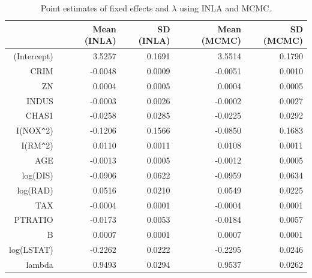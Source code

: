 \documentclass[article]{jss}
\begin{document}
\begin{table}[ht]
\centering
\begin{tabular}{rrrrr}
  \hline
 & Mean (INLA) & SD (INLA) & Mean (MCMC) & SD (MCMC) \\ 
  \hline
(Intercept) & 3.5257 & 0.1691 & 3.5514 & 0.1790 \\ 
  CRIM & -0.0048 & 0.0009 & -0.0051 & 0.0010 \\ 
  ZN & 0.0004 & 0.0005 & 0.0004 & 0.0005 \\ 
  INDUS & -0.0003 & 0.0026 & -0.0002 & 0.0027 \\ 
  CHAS1 & -0.0258 & 0.0285 & -0.0225 & 0.0292 \\ 
  I(NOX\verb|^|2) & -0.1206 & 0.1566 & -0.0850 & 0.1683 \\ 
  I(RM\verb|^|2) & 0.0110 & 0.0011 & 0.0108 & 0.0011 \\ 
  AGE & -0.0013 & 0.0005 & -0.0012 & 0.0005 \\ 
  log(DIS) & -0.0906 & 0.0622 & -0.0959 & 0.0634 \\ 
  log(RAD) & 0.0516 & 0.0210 & 0.0549 & 0.0225 \\ 
  TAX & -0.0004 & 0.0001 & -0.0004 & 0.0001 \\ 
  PTRATIO & -0.0173 & 0.0053 & -0.0184 & 0.0057 \\ 
  B & 0.0007 & 0.0001 & 0.0007 & 0.0001 \\ 
  log(LSTAT) & -0.2262 & 0.0222 & -0.2295 & 0.0246 \\ 
  lambda & 0.9493 & 0.0294 & 0.9537 & 0.0262 \\ 
   \hline
\end{tabular}
\caption{Point estimates of fixed effects and $\lambda$ using INLA and MCMC.} 
\label{tab:leroux}
\end{table}
\end{document}
